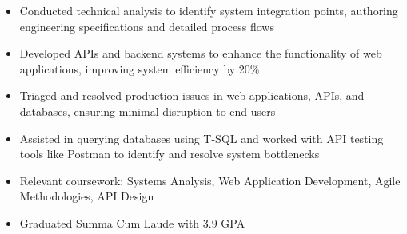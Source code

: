 \par\smallskip
\begin{minipage}{13.75cm}
  \begin{minipage}{6.5cm}
    \begin{itemize}
      \item Conducted technical analysis to identify system integration points, authoring engineering specifications and detailed process flows
      \item Developed APIs and backend systems to enhance the functionality of web applications, improving system efficiency by 20\%
    \end{itemize}
  \end{minipage}
  \hfill
  \begin{minipage}{6.5cm}
    \begin{itemize}
      \item Triaged and resolved production issues in web applications, APIs, and databases, ensuring minimal disruption to end users
      \item Assisted in querying databases using T-SQL and worked with API testing tools like Postman to identify and resolve system bottlenecks
    \end{itemize}
  \end{minipage}
\end{minipage}

\par\bigskip
{}
\begin{itemize}
  \item Relevant coursework: Systems Analysis, Web Application Development, Agile Methodologies, API Design
\end{itemize}
\divider

\begin{itemize}
  \item Graduated Summa Cum Laude with 3.9 GPA
\end{itemize}


